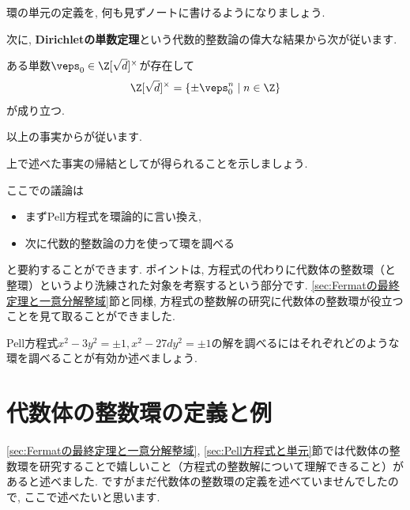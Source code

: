 \documentclass[11pt,b5paper,oneside,titlepage,lualatex]{ltjsreport}
\begin{document}
\begin{exc}{}{}
	環の単元の定義を, 何も見ずノートに書けるようになりましょう. 
\end{exc}

次に, \textbf{Dirichletの単数定理}という代数的整数論の偉大な結果から次が従います. 

\begin{thm}{}{}
	ある単数$ \veps_0 \in \Z[\sqrt{d}]^\times $が存在して
	\[
	\Z[\sqrt{d}]^\times = \{ \pm \veps_0^n \mid n \in \Z \}
	\]
	が成り立つ. 
\end{thm}

以上の事実からが従います. 

\begin{exc}{}{}
	上で述べた事実の帰結としてが得られることを示しましょう. 
\end{exc}

ここでの議論は
\begin{itemize}
	\item まずPell方程式を環論的に言い換え, 
	\item 次に代数的整数論の力を使って環を調べる
\end{itemize}
と要約することができます. 
ポイントは, 方程式の代わりに代数体の整数環（と整環）というより洗練された対象を考察するという部分です. 
\ref{sec:Fermatの最終定理と一意分解整域}節と同様, 方程式の整数解の研究に代数体の整数環が役立つことを見て取ることができました. 

\begin{exc}{}{}
	Pell方程式$ x^2 - 3y^2 = \pm 1, x^2 - 27dy^2 = \pm 1 $の解を調べるにはそれぞれどのような環を調べることが有効か述べましょう. 
\end{exc}


\section{代数体の整数環の定義と例} \label{sec:代数体の整数環の定義と例}


\ref{sec:Fermatの最終定理と一意分解整域}, \ref{sec:Pell方程式と単元}節では代数体の整数環を研究することで嬉しいこと（方程式の整数解について理解できること）があると述べました. 
ですがまだ代数体の整数環の定義を述べていませんでしたので, ここで述べたいと思います. 
\end{document}
